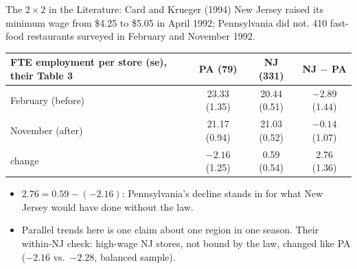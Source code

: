 \documentclass[aspectratio=169,11pt,xcolor=dvipsnames]{beamer}
\begin{document}
\begin{frame}{The $2\times2$ in the Literature: Card and Krueger (1994)}
New Jersey raised its minimum wage from \$4.25 to \$5.05 in April 1992;
Pennsylvania did not. 410 fast-food restaurants surveyed in February and
November 1992.
\vskip3pt
\begin{center}\small
\renewcommand{\arraystretch}{1.15}
\begin{tabular}{@{}lccc@{}}
\toprule
FTE employment per store (se), their Table 3 & PA (79) & NJ (331) & NJ $-$ PA \\
\midrule
February (before) & 23.33 (1.35) & 20.44 (0.51) & $-2.89$ (1.44) \\
November (after) & 21.17 (0.94) & 21.03 (0.52) & $-0.14$ (1.07) \\
change & $-2.16$ (1.25) & 0.59 (0.54) & \alert{2.76 (1.36)} \\
\bottomrule
\end{tabular}
\end{center}
\vskip3pt
\begin{itemize}\itemsep2pt
  \item $2.76 = 0.59 - (-2.16)$: Pennsylvania's decline stands in for what New
        Jersey would have done without the law.
  \item Parallel trends here is one claim about one region in one season.
        Their within-NJ check: high-wage NJ stores, not bound by the law,
        changed like PA ($-2.16$ vs.\ $-2.28$, balanced sample).
\end{itemize}
\end{frame}
\end{document}
